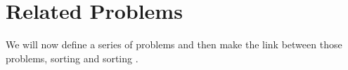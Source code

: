 \chapter{Related Problems}

We will now define a series of problems and then make the link between those
problems, sorting and sorting \XY.

